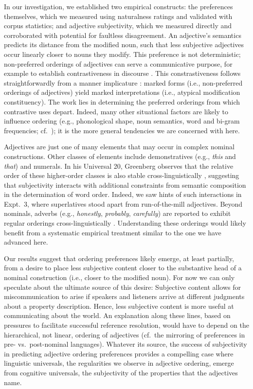 \documentclass[12pt]{article}
\begin{document}
In our investigation, we established two empirical constructs: the preferences themselves, which we measured using naturalness ratings and validated with corpus statistics; and adjective subjectivity, which we measured directly and corroborated with potential for faultless disagreement. 
An adjective's semantics predicts its distance from the modified noun, such that less subjective adjectives occur linearly closer to nouns they modify. 
This preference is not deterministic; non-preferred orderings of adjectives can serve a communicative purpose, for example to establish contrastiveness in discourse \citep{martin1969,Martin1970,Hill1958,vendler1963}. This constrastiveness follows straightforwardly from a manner implicature \citep{levinson2000}: marked forms (i.e., non-preferred orderings of adjectives) yield marked interpretations (i.e., atypical modification constituency). The work lies in determining the preferred orderings from which  contrastive uses depart. Indeed, many other situational factors are likely to influence ordering (e.g., phonological shape, noun semantics, word and bi-gram frequencies; cf.~\citealp{wulff2003}); it is the more general tendencies we are concerned with here.

Adjectives are just one of many elements that may occur in complex nominal constructions. Other classes of elements include demonstratives (e.g., \emph{this} and \emph{that}) and numerals. In his Universal 20, Greenberg observes that the relative order of these higher-order classes is also stable cross-linguistically \citep{greenberg1963,Culbertson2014}, suggesting that subjectivity interacts with additional constraints from semantic composition in the determination of word order. Indeed, we saw hints of such interactions in Expt.~3, where superlatives stood apart from run-of-the-mill adjectives. Beyond nominals, adverbs (e.g., \emph{honestly}, \emph{probably}, \emph{carefully}) are reported to exhibit regular orderings cross-linguistically \citep{cinque1999,ernst2002}. Understanding these orderings would likely benefit from a systematic empirical treatment similar to the one we have advanced here.

Our results suggest that ordering preferences likely emerge, at least partially, from a desire to place less subjective content closer to the substantive head of a nominal construction (i.e., closer to the modified noun). 
For now we can only speculate about the ultimate source of this desire: Subjective content allows for miscommunication to arise if speakers and listeners arrive at different judgments about a property description. Hence, less subjective content is more useful at communicating about the world. 
An explanation along these lines, based on pressures to facilitate successful reference resolution, would have to depend on the hierarchical, not linear, ordering of adjectives (cf.~the mirroring of preferences in pre- vs.~post-nominal languages). 
Whatever its source, the success of subjectivity in predicting adjective ordering preferences provides a compelling case where linguistic universals, the regularities we observe in adjective ordering, emerge from cognitive universals, the subjectivity of the properties that the adjectives name.
\end{document}
